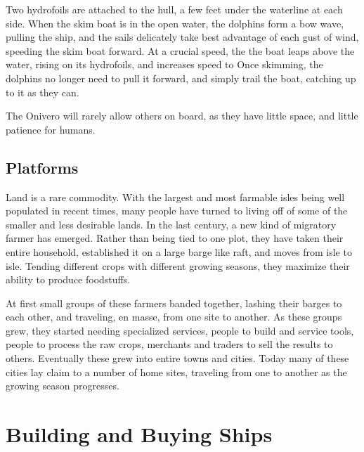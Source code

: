 \begin{multicols*}{2}
Two hydrofoils are attached to the hull, a few feet under the waterline at each side. When the skim boat is in the open water, the dolphins form a bow wave, pulling the ship,
and the sails delicately take best advantage of each gust of wind, speeding the skim boat forward. At a crucial speed, the the boat leaps above the water, rising on its hydrofoils, and increases speed to  Once skimming, the dolphins no longer need to pull it forward, and simply trail the boat, catching up to it as they can.

The Onivero will rarely allow others on board, as they have little space, and little patience for humans.
\subsection{Platforms}
Land is a rare commodity. With the largest and most farmable isles being well populated in recent times, many people have turned to living off of some of the smaller
and less desirable lands. In the last century, a new kind of migratory farmer has emerged. Rather than being tied to one plot, they have taken their entire household, established it on a large barge like raft, and moves from isle to isle. Tending different crops with different growing seasons, they maximize their ability to produce foodstuffs.

At first small groups of these farmers banded together, lashing their barges to each other, and traveling, en masse, from one site to another. As these groups grew, they
started needing specialized services, people to build and service tools, people to process the raw crops, merchants and traders to sell the results to others. Eventually these grew into entire towns and cities. Today many of these cities lay claim to a number of home sites, traveling from one to another as the growing season progresses.
\section{Building and Buying Ships}

\end{multicols*}
